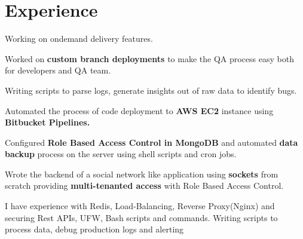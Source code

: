 \documentclass[]{deedy-resume-openfont}
\begin{document}
\begin{minipage}[t]{0.33\textwidth}
%
%

\end{minipage} 
\hfill
\begin{minipage}[t]{0.66\textwidth} 


\section{Experience}

\vspace{\topsep} %
\begin{tightemize}
\item Working on ondemand delivery features.
\item Worked on \textbf{custom branch deployments} to make the QA process easy both for developers and QA team.
\item Writing scripts to parse logs, generate insights out of raw data  to identify bugs.
\end{tightemize}
\sectionsep

\begin{tightemize}
\item Automated the process of code deployment to \textbf{AWS EC2} instance using \textbf{Bitbucket Pipelines.}
\item Configured \textbf{Role Based Access Control in MongoDB} and automated \textbf{data backup} process on the server using shell scripts and cron jobs.
\item Wrote the backend of a social network like application using \textbf{sockets} from scratch providing \textbf{multi-tenanted access} with Role Based Access Control.
\item I have experience with Redis, Load-Balancing, Reverse Proxy(Nginx) and securing Rest APIs, UFW, Bash scripts and commands. Writing scripts to process data, debug production logs and alerting
\end{tightemize}
\sectionsep


\end{minipage}
\end{document}

